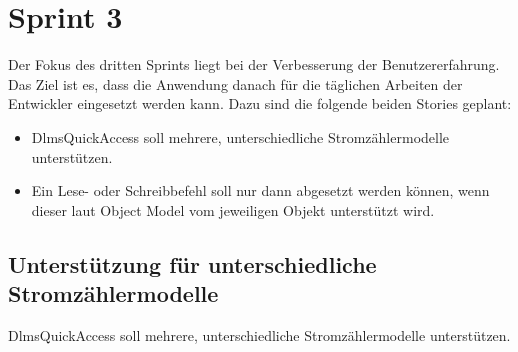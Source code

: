\section{Sprint 3}
Der Fokus des dritten Sprints liegt bei der Verbesserung der Benutzererfahrung.
Das Ziel ist es, dass die Anwendung danach für die täglichen Arbeiten der Entwickler eingesetzt werden kann.
Dazu sind die folgende beiden Stories geplant:
\begin{itemize}
   \item DlmsQuickAccess soll mehrere, unterschiedliche Stromzählermodelle unterstützen.
   \item Ein Lese- oder Schreibbefehl soll nur dann abgesetzt werden können, wenn dieser laut Object Model vom jeweiligen Objekt unterstützt wird.
\end{itemize}




\subsection{Unterstützung für unterschiedliche Stromzählermodelle}
\dq DlmsQuickAccess soll mehrere, unterschiedliche Stromzählermodelle unterstützen.\dq
